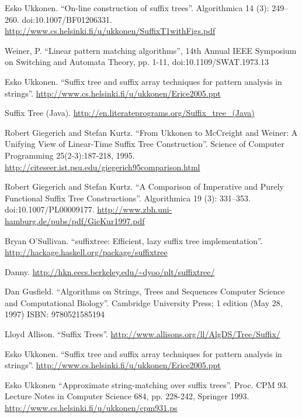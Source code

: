 \begin{thebibliography}{99}

Esko Ukkonen. ``On-line construction of suffix trees''. Algorithmica 14 (3): 249--260. doi:10.1007/BF01206331. \url{http://www.cs.helsinki.fi/u/ukkonen/SuffixT1withFigs.pdf}

Weiner, P. ``Linear pattern matching algorithms'', 14th Annual IEEE Symposium on Switching and Automata Theory, pp. 1-11, doi:10.1109/SWAT.1973.13

Esko Ukkonen. ``Suffix tree and suffix array techniques for pattern analysis in strings''. \url{http://www.cs.helsinki.fi/u/ukkonen/Erice2005.ppt}

Suffix Tree (Java). \url{http://en.literateprograms.org/Suffix_tree_(Java)}

Robert Giegerich and Stefan Kurtz. ``From Ukkonen to McCreight and Weiner: A Unifying View of Linear-Time Suffix Tree Construction''. Science of Computer Programming 25(2-3):187-218, 1995. \url{http://citeseer.ist.psu.edu/giegerich95comparison.html}

Robert Giegerich and Stefan Kurtz. ``A Comparison of Imperative and Purely Functional Suffix Tree Constructions''. Algorithmica 19 (3): 331--353. doi:10.1007/PL00009177. \url{http://www.zbh.uni-hamburg.de/pubs/pdf/GieKur1997.pdf}

Bryan O'Sullivan. ``suffixtree: Efficient, lazy suffix tree implementation''. \url{http://hackage.haskell.org/package/suffixtree}

Danny. \url{http://hkn.eecs.berkeley.edu/~dyoo/plt/suffixtree/}

Dan Gusfield. ``Algorithms on Strings, Trees and Sequences Computer Science and Computational Biology''. Cambridge University Press; 1 edition (May 28, 1997) ISBN: 9780521585194

Lloyd Allison. ``Suffix Trees''. \url{http://www.allisons.org/ll/AlgDS/Tree/Suffix/}

Esko Ukkonen. ``Suffix tree and suffix array techniques for pattern analysis in strings''. \url{http://www.cs.helsinki.fi/u/ukkonen/Erice2005.ppt}

Esko Ukkonen ``Approximate string-matching over suffix trees''. Proc. CPM 93. Lecture Notes in Computer Science 684, pp. 228-242, Springer 1993. \url{http://www.cs.helsinki.fi/u/ukkonen/cpm931.ps}


\end{thebibliography}
